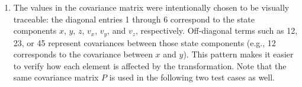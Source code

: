 \documentclass[11pt,fleqn]{report}
\begin{document}
\begin{enumerate}
{\begin{equation*}
\begin{bmatrix}
1 & 0 & 0 \\
0 & 0 & 1 \\
0 & -1 & 0
\end{bmatrix}, \quad
P = 
\begin{bmatrix}
5 & 0 & 0 & 0 & 0 & 0 \\
0 & 5 & 0 & 0 & 0 & 0 \\
0 & 0 & 5 & 0 & 0 & 0 \\
0 & 0 & 0 & 5 & 0 & 0 \\
0 & 0 & 0 & 0 & 5 & 0 \\
0 & 0 & 0 & 0 & 0 & 5
\end{bmatrix} \Longrightarrow
P = 
\begin{bmatrix}
5 & 0 & 0 & 0 & 0 & 0 \\
0 & 5 & 0 & 0 & 0 & 0 \\
0 & 0 & 5 & 0 & 0 & 0 \\
0 & 0 & 0 & 5 & 0 & 0 \\
0 & 0 & 0 & 0 & 5 & 0 \\
0 & 0 & 0 & 0 & 0 & 5
\end{bmatrix}
\end{equation*}}
\item{
The values in the covariance matrix were intentionally chosen to be 
visually traceable: the diagonal entries 1 through 6 correspond to the 
state components $x$, $y$, $z$, $v_x$, $v_y$, and $v_z$, respectively. 
Off-diagonal terms such as 12, 23, or 45 represent covariances between 
those state components (e.g., 12 corresponds to the covariance between 
$x$ and $y$). This pattern makes it easier to verify how each element 
is affected by the transformation. Note that the same covariance matrix $P$ 
is used in the following two test cases as well.

}
\end{enumerate}
\end{document}
